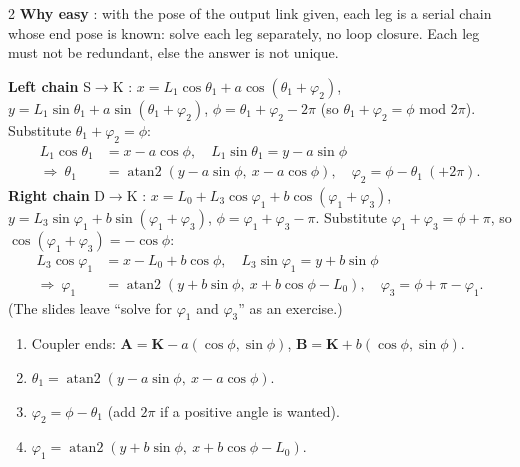 \begin{multicols}{2}
\textbf{Why easy} : with the pose of the output link given, each leg is a serial chain whose end pose is known: solve each leg separately, no loop closure. Each leg must not be redundant, else the answer is not unique.
\begin{deriv}
\textbf{Left chain} {S}$\to$K : $x=L_1\cos\theta_1+a\cos(\theta_1+\varphi_2)$, $y=L_1\sin\theta_1+a\sin(\theta_1+\varphi_2)$, $\phi=\theta_1+\varphi_2-2\pi$ (so $\theta_1+\varphi_2=\phi$ mod $2\pi$). Substitute $\theta_1+\varphi_2=\phi$:
\[\begin{aligned}L_1\cos\theta_1&=x-a\cos\phi,\quad L_1\sin\theta_1=y-a\sin\phi\\ \Rightarrow\ \theta_1&=\operatorname{atan2}(y-a\sin\phi,\ x-a\cos\phi),\quad\varphi_2=\phi-\theta_1\ (+2\pi).\end{aligned}\]
\textbf{Right chain} {D}$\to$K : $x=L_0+L_3\cos\varphi_1+b\cos(\varphi_1+\varphi_3)$, $y=L_3\sin\varphi_1+b\sin(\varphi_1+\varphi_3)$, $\phi=\varphi_1+\varphi_3-\pi$. Substitute $\varphi_1+\varphi_3=\phi+\pi$, so $\cos(\varphi_1+\varphi_3)=-\cos\phi$:
\[\begin{aligned}L_3\cos\varphi_1&=x-L_0+b\cos\phi,\quad L_3\sin\varphi_1=y+b\sin\phi\\ \Rightarrow\ \varphi_1&=\operatorname{atan2}(y+b\sin\phi,\ x+b\cos\phi-L_0),\quad\varphi_3=\phi+\pi-\varphi_1.\end{aligned}\]
(The slides leave ``solve for $\varphi_1$ and $\varphi_3$'' as an exercise.)
\end{deriv}
\begin{recipe}
\begin{enumerate}
\item Coupler ends: $\mathbf A=\mathbf K-a(\cos\phi,\sin\phi)$, $\mathbf B=\mathbf K+b(\cos\phi,\sin\phi)$.
\item $\theta_1=\operatorname{atan2}(y-a\sin\phi,\ x-a\cos\phi)$.
\item $\varphi_2=\phi-\theta_1$ (add $2\pi$ if a positive angle is wanted).
\item $\varphi_1=\operatorname{atan2}(y+b\sin\phi,\ x+b\cos\phi-L_0)$.

\end{enumerate}
\end{recipe}
\end{multicols}
